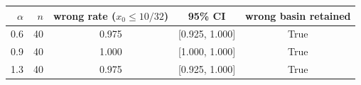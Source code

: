 \begin{tabular}{rrccc}
\toprule
$\alpha$ & $n$ & wrong rate ($x_0\le 10/32$) & 95\% CI & wrong basin retained \\
\midrule
0.6 & 40 & 0.975 & [0.925, 1.000] & True \\
0.9 & 40 & 1.000 & [1.000, 1.000] & True \\
1.3 & 40 & 0.975 & [0.925, 1.000] & True \\
\bottomrule
\end{tabular}